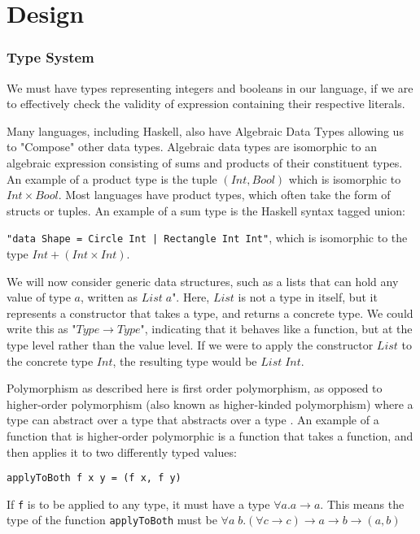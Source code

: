 \chapter{Design}
\label{chap:design}



\subsection{Type System}
We must have types representing integers and booleans in our language, if we are to effectively check the validity of expression containing their respective literals. 

Many languages, including Haskell, also have Algebraic Data Types allowing us to "Compose" other data types. Algebraic data types are isomorphic to an algebraic expression consisting of sums and products of their constituent types. An example of a product type is the tuple \((Int,Bool)\) which is isomorphic to \(Int \times Bool\). Most languages have product types, which often take the form of structs or tuples. 
An example of a sum type is the Haskell syntax tagged union:

\noindent\verb!"data Shape = Circle Int | Rectangle Int Int"!, which is isomorphic to the type \(Int + (Int \times Int)\). 

We will now consider generic data structures, such as a lists that can hold any value of type $a$, written as \(List\;a\)". Here, \(List\) is not a type in itself, but it represents a constructor that takes a type, and returns a concrete type. We could write this as "$Type \rightarrow Type$", indicating that it behaves like a function, but at the type level rather than the value level. If we were to apply the constructor \(List\) to the concrete type \(Int\), the resulting type would be \(List \;Int\). 

Polymorphism as described here is first order polymorphism, as opposed to higher-order polymorphism (also known as higher-kinded polymorphism) where a type can abstract over a type that abstracts over a type \cite{pierce2002types}. An example of a function that is higher-order polymorphic is a function that takes a function, and then applies it to two differently typed values:
\begin{lstlisting}
applyToBoth f x y = (f x, f y)
\end{lstlisting}
If \verb|f| is to be applied to any type, it must have a type \(\forall a. a\rightarrow a\). This means the type of the function \verb|applyToBoth| must be \(\forall a \;b.(\forall c \rightarrow c) \rightarrow a \rightarrow b \rightarrow (a, b)\)

